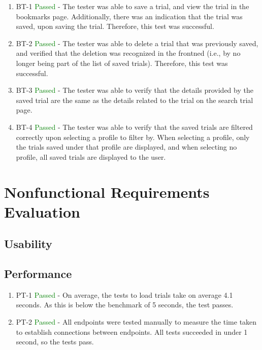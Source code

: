 \documentclass[12pt, titlepage]{article}
\begin{document}

\normalsize

\begin{enumerate}
  \item BT-1 \textcolor{green}{Passed} - The tester was able to save a trial, and view the trial in the bookmarks page. Additionally, there was an indication that
  the trial was saved, upon saving the trial. Therefore, this test was successful.
  \item BT-2 \textcolor{green}{Passed} - The tester was able to delete a trial that was previously saved, and verified that the deletion was recognized in the frontned (i.e., by 
  no longer being part of the list of saved trials). Therefore, this test was successful.
  \item BT-3 \textcolor{green}{Passed} - The tester was able to verify that the details provided by the saved trial are the same as the details related to the trial 
  on the search trial page.
  \item BT-4 \textcolor{green}{Passed} - The tester was able to verify that the saved trials are filtered correctly upon selecting a profile to filter by. When selecting a 
  profile, only the trials saved under that profile are displayed, and when selecting no profile, all saved trials are displayed to the user.

\end{enumerate}


\section{Nonfunctional Requirements Evaluation}

\subsection{Usability}
		
\subsection{Performance}
\begin{enumerate}
  \item PT-1 \textcolor{green}{Passed} - On average, the tests to load trials take on average 4.1 seconds. As this is below the benchmark of 5 seconds, the test passes.
\item PT-2 \textcolor{green}{Passed} - All endpoints were tested manually to measure the time taken to establish connections between endpoints. All tests succeeded in under 1 second, so the tests pass.
\end{enumerate}
\end{document}
